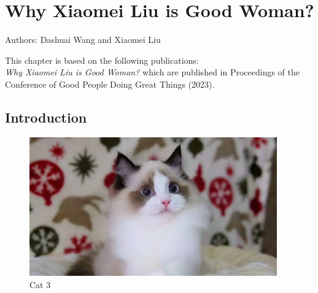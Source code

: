 \chapter{Why Xiaomei Liu is Good Woman?}

\vspace*{\fill}
	\begin{center}
		Authors: Dashuai Wang and Xiaomei Liu
	\end{center}
\vspace*{\fill}


\vfill
\begin{center}
	This chapter is based on the following publications:\\ \textit{Why Xiaomei Liu is Good Woman?} \citep{wang_2023} which are published in Proceedings of the Conference of Good People Doing Great Things (2023).
\end{center}

\newpage

\section{Introduction}
\begin{figure}[h]
	\centering
	\includegraphics[width=0.95\textwidth]{chapter-2/images/fig3}
	\caption{Cat 3}
\end{figure}
